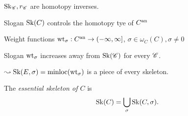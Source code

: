 \begin{frame}
\begin{figure}[ht]
    \centering
\end{figure}
\pause
$\operatorname{Sk}_{\mathscr C}, r_{\mathscr C}$ are homotopy inverses.
\begin{block}{Slogan}
	$\operatorname{Sk}(C)$ controls the homotopy tye of $C{}^{\text{an}}$
\end{block}
\end{frame}
\begin{frame}
	Weight functions $\operatorname{wt}_{\sigma}: C{}^{\text{an}} \to \left(-\infty, \infty\right]$, $\sigma \in \omega_{C}(C), \sigma \ne 0$
	\begin{block}{Slogan}
		$\operatorname{wt}_{\sigma}$ increases away from $\operatorname{Sk}(\mathscr C)$ for every $\mathscr C$.
	\end{block}
	$\leadsto \operatorname{Sk}(E, \sigma) = \operatorname{minloc}(\operatorname{wt}_{\sigma})$ is a piece of every skeleton. 
	
	\begin{definition}
		The \emph{essential skeleton of $C$} is \[
			\operatorname{Sk}(C) = \bigcup_{\sigma }  \operatorname{Sk}(C, \sigma)
		.\] 
	\end{definition}
\end{frame}
